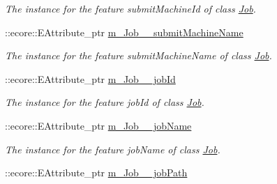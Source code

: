 \begin{DoxyCompactItemize}
\begin{DoxyCompactList}\small\item\em The instance for the feature submitMachineId of class \hyperlink{classTMS__Data_1_1Job}{Job}. \item\end{DoxyCompactList}\item 
\hypertarget{classTMS__Data_1_1TMS__DataPackage_ae681efb8e13a9a68224e82eaa419afc2}{
::ecore::EAttribute\_\-ptr \hyperlink{classTMS__Data_1_1TMS__DataPackage_ae681efb8e13a9a68224e82eaa419afc2}{m\_\-Job\_\-\_\-submitMachineName}}
\label{classTMS__Data_1_1TMS__DataPackage_ae681efb8e13a9a68224e82eaa419afc2}

\begin{DoxyCompactList}\small\item\em The instance for the feature submitMachineName of class \hyperlink{classTMS__Data_1_1Job}{Job}. \item\end{DoxyCompactList}\item 
\hypertarget{classTMS__Data_1_1TMS__DataPackage_add2b1e2ddcea976b31e5df0745077358}{
::ecore::EAttribute\_\-ptr \hyperlink{classTMS__Data_1_1TMS__DataPackage_add2b1e2ddcea976b31e5df0745077358}{m\_\-Job\_\-\_\-jobId}}
\label{classTMS__Data_1_1TMS__DataPackage_add2b1e2ddcea976b31e5df0745077358}

\begin{DoxyCompactList}\small\item\em The instance for the feature jobId of class \hyperlink{classTMS__Data_1_1Job}{Job}. \item\end{DoxyCompactList}\item 
\hypertarget{classTMS__Data_1_1TMS__DataPackage_ac95e550f24b1295df497db87bfc0b42d}{
::ecore::EAttribute\_\-ptr \hyperlink{classTMS__Data_1_1TMS__DataPackage_ac95e550f24b1295df497db87bfc0b42d}{m\_\-Job\_\-\_\-jobName}}
\label{classTMS__Data_1_1TMS__DataPackage_ac95e550f24b1295df497db87bfc0b42d}

\begin{DoxyCompactList}\small\item\em The instance for the feature jobName of class \hyperlink{classTMS__Data_1_1Job}{Job}. \item\end{DoxyCompactList}\item 
\hypertarget{classTMS__Data_1_1TMS__DataPackage_aa2bbc6da8ee7392af2c72a4e454cafef}{
::ecore::EAttribute\_\-ptr \hyperlink{classTMS__Data_1_1TMS__DataPackage_aa2bbc6da8ee7392af2c72a4e454cafef}{m\_\-Job\_\-\_\-jobPath}}
\label{classTMS__Data_1_1TMS__DataPackage_aa2bbc6da8ee7392af2c72a4e454cafef}


\end{DoxyCompactItemize}

